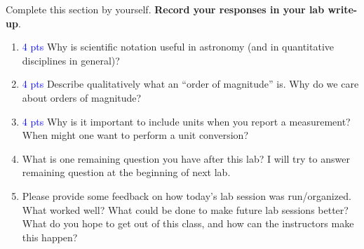 \documentclass[11pt]{article}
\begin{document}
Complete this section by yourself. \textbf{Record your responses in your lab write-up}. 
\begin{enumerate}
    \item \textcolor{blue}{4 pts} Why is scientific notation useful in astronomy (and in quantitative disciplines in general)?
    
    \item \textcolor{blue}{4 pts} Describe qualitatively what an ``order of magnitude'' is. Why do we care about orders of magnitude?
    
    \item \textcolor{blue}{4 pts} Why is it important to include units when you report a measurement? When might one want to perform a unit conversion?
    
    \item What is one remaining question you have after this lab?  I will try to answer remaining question at the beginning of next lab. 
    
    \item Please provide some feedback on how today's lab session was run/organized. What worked well? What could be done to make future lab sessions better? What do you hope to get out of this class, and how can the instructors make this happen?
\end{enumerate}
\end{document}
